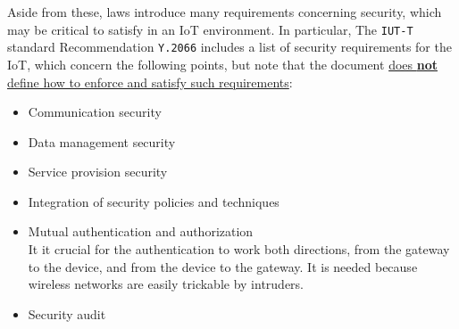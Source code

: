 
Aside from these, laws introduce many requirements concerning security, which may be critical to satisfy in an IoT environment.
In particular, The \texttt{IUT-T} standard Recommendation \texttt{Y.2066} includes a list of security requirements for the IoT, which concern the following points, but note that the document \ul{does \textbf{not} define how to enforce and satisfy such requirements}:
\ns
\begin{itemize}
   \item Communication security
   \item Data management security
   \item Service provision security
   \item Integration of security policies and techniques
   \item Mutual authentication and authorization\\
   It it crucial for the authentication to work both directions, from the gateway to the device, and from the device to the gateway.
   It is needed because wireless networks are easily trickable by intruders. 
   \item Security audit
\end{itemize}
\nl

